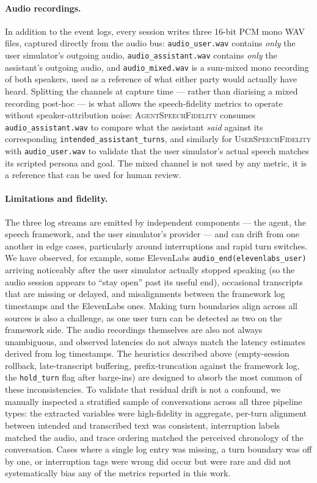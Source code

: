 \paragraph{Audio recordings.}
In addition to the event logs, every session writes three 16-bit PCM mono WAV files, captured directly from the audio bus: \texttt{audio\_user.wav} contains \emph{only} the user simulator's outgoing audio, \texttt{audio\_assistant.wav} contains \emph{only} the assistant's outgoing audio, and \texttt{audio\_mixed.wav} is a sum-mixed mono recording of both speakers, used as a reference of what either party would actually have heard. Splitting the channels at capture time --- rather than diarising a mixed recording post-hoc --- is what allows the speech-fidelity metrics to operate without speaker-attribution noise: \textsc{AgentSpeechFidelity} consumes \texttt{audio\_assistant.wav} to compare what the assistant \emph{said} against its corresponding \texttt{intended\_assistant\_turns}, and similarly for \textsc{UserSpeechFidelity} with \texttt{audio\_user.wav} to validate that the user simulator's actual speech matches its scripted persona and goal. The mixed channel is not used by any metric, it is a reference that can be used for human review.

\paragraph{Limitations and fidelity.}
The three log streams are emitted by independent components --- the agent, the speech framework, and the user simulator's provider --- and can drift from one another in edge cases, particularly around interruptions and rapid turn switches. We have observed, for example, some ElevenLabs \texttt{audio\_end(elevenlabs\_user)} arriving noticeably after the user simulator actually stopped speaking (so the audio session appears to ``stay open'' past its useful end), occasional transcripts that are missing or delayed, and misalignments between the framework log timestamps and the ElevenLabs ones. Making turn boundaries align across all sources is also a challenge, as one user turn can be detected as two on the framework side. The audio recordings themselves are also not always unambiguous, and observed latencies do not always match the latency estimates derived from log timestamps. The heuristics described above (empty-session rollback, late-transcript buffering, prefix-truncation against the framework log, the \texttt{hold\_turn} flag after barge-ins) are designed to absorb the most common of these inconsistencies. To validate that residual drift is not a confound, we manually inspected a stratified sample of conversations across all three pipeline types: the extracted variables were high-fidelity in aggregate, per-turn alignment between intended and transcribed text was consistent, interruption labels matched the audio, and trace ordering matched the perceived chronology of the conversation. Cases where a single log entry was missing, a turn boundary was off by one, or interruption tags were wrong did occur but were rare and did not systematically bias any of the metrics reported in this work.


